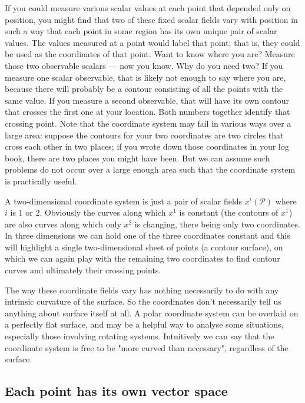 If you could measure various scalar values at each point that depended only on position, you might find that two of these fixed scalar fields vary with position in such a way that each point in some region has its own unique pair of scalar values. The values measured at a point would label that point; that is, they could be used as the coordinates of that point. Want to know where you are? Measure those two observable scalars --- now you know. Why do you need two? If you measure one scalar observable, that is likely not enough to say where you are, because there will probably be a contour consisting of all the points with the same value. If you measure a second observable, that will have its own contour that crosses the first one at your location. Both numbers together identify that crossing point. Note that the coordinate system may fail in various ways over a large area: suppose the contours for your two coordinates are two circles that cross each other in two places; if you wrote down those coordinates in your log book, there are two places you might have been. But we can assume such problems do not occur over a large enough area such that the coordinate system is practically useful.

A two-dimensional coordinate system is just a pair of scalar fields $x^i(\mathcal{P})$ where $i$ is $1$ or $2$. Obviously the curves along which $x^1$ is constant (the contours of $x^1$) are also curves along which only $x^2$ is changing, there being only two coordinates. In three dimensions we can hold one of the three coordinates constant and this will highlight a single two-dimensional sheet of points (a contour surface), on which we can again play with the remaining two coordinates to find contour curves and ultimately their crossing points.

The way these coordinate fields vary has nothing necessarily to do with any intrinsic curvature of the surface. So the coordinates don't necessarily tell us anything about surface itself at all. A polar coordinate system can be overlaid on a perfectly flat surface, and may be a helpful way to analyse some situations, especially those involving rotating systems. Intuitively we can say that the coordinate system is free to be "more curved than necessary", regardless of the surface.

\subsection{Each point has its own vector space}


